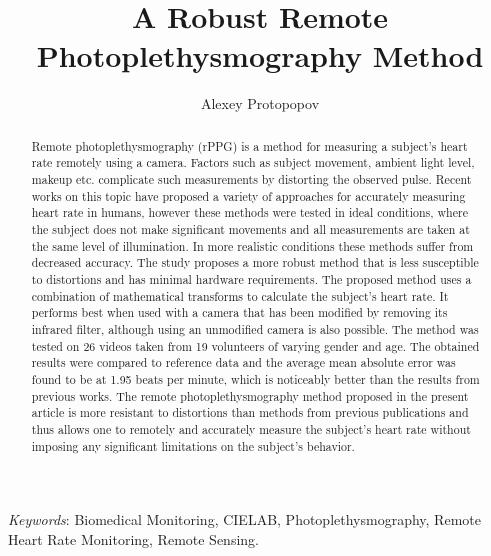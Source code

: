 \documentclass[11pt]{article} %
\title{A Robust Remote Photoplethysmography Method}
\author[1]{Alexey Protopopov}
\affil[1]{Joint Stock Research and Production Company Kryptonite \authorcr
E-mail: a.protopopov@kryptonite.ru}
\date{}
\begin{document}

    \maketitle

    \begin{abstract}
        Remote photoplethysmography (rPPG) is a method for measuring a subject’s heart rate remotely using a camera. Factors such as subject movement, ambient light level, makeup etc. complicate such measurements by distorting the observed pulse. Recent works on this topic have proposed a variety of approaches for accurately measuring heart rate in humans, however these methods were tested in ideal conditions, where the subject does not make significant movements and all measurements are taken at the same level of illumination. In more realistic conditions these methods suffer from decreased accuracy. The study proposes a more robust method that is less susceptible to distortions and has minimal hardware requirements. The proposed method uses a combination of mathematical transforms to calculate the subject’s heart rate. It performs best when used with a camera that has been modified by removing its infrared filter, although using an unmodified camera is also possible. The method was tested on 26 videos taken from 19 volunteers of varying gender and age. The obtained results were compared to reference data and the average mean absolute error was found to be at 1.95 beats per minute, which is noticeably better than the results from previous works. The remote photoplethysmography method proposed in the present article is more resistant to distortions than methods from previous publications and thus allows one to remotely and accurately measure the subject’s heart rate without imposing any significant limitations on the subject’s behavior.
    \end{abstract}

    \emph{Keywords}: Biomedical Monitoring, CIELAB, Photoplethysmography, Remote Heart Rate Monitoring, Remote Sensing.

    
\end{document}
